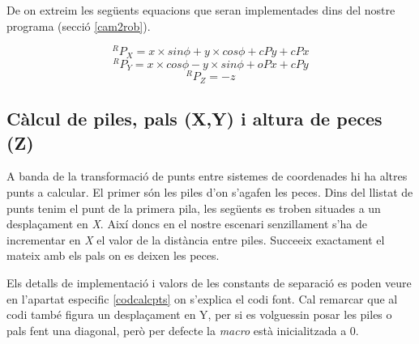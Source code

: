 De on extreim les següents equacions que seran implementades dins del
nostre programa (secció \ref{cam2rob}).

$$^RP_X = x\times sin \phi + y \times cos \phi + cPy + cPx$$
$$^RP_Y = x\times cos \phi - y \times sin \phi + oPx + cPy$$
$$^RP_Z = -z$$

\subsection{Càlcul de piles, pals (X,Y) i altura de peces (Z)} \label{calcpts}
A banda de la transformació de punts entre sistemes de coordenades hi ha altres
punts a calcular.
El primer són les piles d'on s'agafen les peces. Dins del llistat de punts
tenim el punt de la primera pila, les següents es troben situades a un
desplaçament en \emph{X}. Així doncs en el nostre escenari senzillament s'ha de
incrementar en \emph{X} el valor de la distància entre piles. Succeeix exactament
el mateix amb els pals on es deixen les peces.

Els detalls de implementació i valors de les constants de separació es poden
veure en l'apartat especific \ref{codcalcpts} on s'explica el codi font. Cal
remarcar que al codi també figura un desplaçament en Y, per si es volguessin
posar les piles o pals fent una diagonal, però per defecte la \emph{macro}
està inicialitzada a 0.




